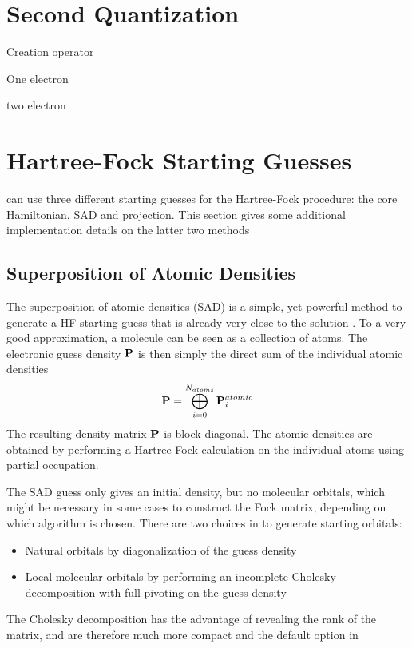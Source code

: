 \appendix
\chapter{Second Quantization}

Creation operator

One electron

two electron

\chapter{Hartree-Fock Starting Guesses \label{sec:SCFGUESS}}

\mchem{} can use three different starting guesses for the Hartree-Fock procedure: the core Hamiltonian, SAD and projection. This section gives some additional implementation details on the latter two methods

\section{Superposition of Atomic Densities}

The superposition of atomic densities (SAD) is a simple, yet powerful method to generate a HF starting guess that is already very close to the solution \cite{Van2006,Leh2019}. To a very good approximation, a molecule can be seen as a collection of atoms. The electronic guess density $\mathbf{P}$ is then simply the direct sum of the individual atomic densities 
\begin{equation}
\mathbf{P} = \bigoplus_{i=0}^{N_{atoms}} \mathbf{P}^{atomic}_i 
\end{equation}
\noindent The resulting density matrix $\mathbf{P}$ is block-diagonal. The atomic densities are obtained by performing a Hartree-Fock calculation on the individual atoms using partial occupation.

The SAD guess only gives an initial density, but no molecular orbitals, which might be necessary in some cases to construct the Fock matrix, depending on which algorithm is chosen. There are two choices in \mchem{} to generate starting orbitals:
\begin{itemize}
\item Natural orbitals by diagonalization of the guess density
\item Local molecular orbitals by performing an incomplete Cholesky decomposition with full pivoting on the guess density
\end{itemize}
The Cholesky decomposition has the advantage of revealing the rank of the matrix, and are therefore much more compact and the default option in \mchem{}

